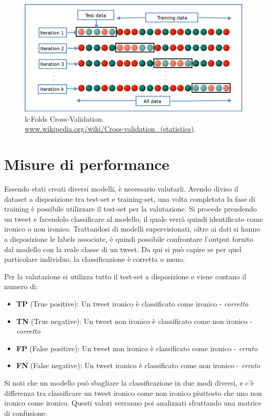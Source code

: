 \documentclass[oneside]{book}
\begin{document}
\begin{figure}[!h]
	\centering
	\includegraphics[width=13cm]{assets/cross-validation.png}
	\caption{k-Folds Cross-Validation. \\ \url{www.wikipedia.org/wiki/Cross-validation_(statistics)}.}
	\label{fig:cross-validation}
\end{figure}


\section{Misure di performance}
Essendo stati creati diversi modelli, è necessario valutarli. Avendo diviso il dataset a disposizione tra test-set e training-set, una volta completata la fase di training è possibile utilizzare il test-set per la valutazione. Si procede prendendo un tweet e facendolo classificare al modello, il quale verrà quindi identificato come ironico o non ironico. Trattandosi di modelli supervisionati, oltre ai dati si hanno a disposizione le labels associate, è quindi possibile confrontare l'output fornito dal modello con la reale classe di un tweet. Da qui si può capire se per quel particolare individuo, la classificazione è corretta o meno.

Per la valutazione si utilizza tutto il test-set a disposizione e viene contano il numero di:
\begin{itemize}
	\item \textbf{TP} (True positive): Un tweet ironico è classificato come ironico - \emph{corretto}
	
	\item \textbf{TN} (True negative): Un tweet non ironico è classificato come non ironico - \emph{corretto}
	
	\item \textbf{FP} (False positive):	Un tweet non ironico è classificato come ironico - \emph{errato}
	
	\item \textbf{FN} (False negative):	Un tweet ironico è classificato come non ironico - \emph{errato}
\end{itemize}
Si noti che un modello può sbagliare la classificazione in due modi diversi, e c'è differenza tra classificare un tweet ironico come non ironico piuttosto che uno non ironico come ironico. Questi valori verranno poi analizzati sfruttando una matrice di confusione:
\end{document}
